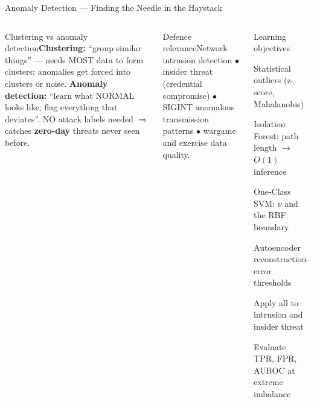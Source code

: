 \documentclass[aspectratio=169,10pt,t]{beamer}
\begin{document}

\begin{frame}{Anomaly Detection --- Finding the Needle in the Haystack}
\begin{columns}[T]
\begin{cbox}[ISSAnavy]{Clustering vs anomaly detection}\scriptsize \textbf{Clustering:} ``group similar things'' --- needs MOST data to form clusters; anomalies get forced into clusters or noise. \textbf{Anomaly detection:} ``learn what NORMAL looks like; flag everything that deviates''. NO attack labels needed $\Rightarrow$ catches \textbf{zero-day} threats never seen before.\end{cbox}
\begin{cbox}[ISSAgrn]{Defence relevance}\scriptsize Network intrusion detection $\bullet$ insider threat (credential compromise) $\bullet$ SIGINT anomalous transmission patterns $\bullet$ wargame and exercise data quality.\end{cbox}
\begin{cbox}{Learning objectives}\scriptsize\begin{te}\item Statistical outliers (z-score, Mahalanobis)\item Isolation Forest: path length $\to$ $O(1)$ inference\item One-Class SVM: $\nu$ and the RBF boundary\item Autoencoder reconstruction-error thresholds\item Apply all to intrusion and insider threat\item Evaluate TPR, FPR, AUROC at extreme imbalance\end{te}\end{cbox}
\end{columns}
\end{frame}
\end{document}
